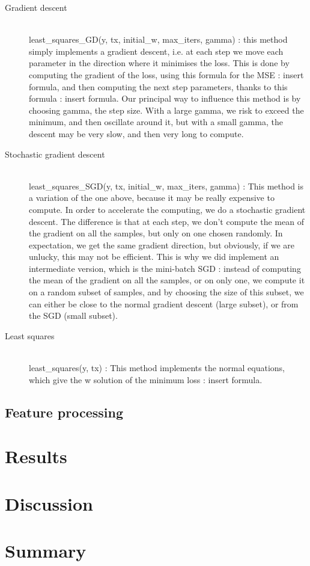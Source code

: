\documentclass[10pt,conference,compsocconf]{IEEEtran}
\begin{document}
\begin{description}

\item[Gradient descent] \ \\
least\_squares\_GD(y, tx, initial\_w, max\_iters, gamma) : this method simply implements a gradient descent, i.e. at each step we move each parameter in the direction where it minimises the loss. This is done by computing the gradient of the loss, using this formula for the MSE : {insert formula}, and then computing the next step parameters, thanks to this formula : {insert formula}. Our principal way to influence this method is by choosing gamma, the step size. With a large gamma, we risk to exceed the minimum, and then oscillate around it, but with a small gamma, the descent may be very slow, and then very long to compute.

\item[Stochastic gradient descent] \ \\
least\_squares\_SGD(y, tx, initial\_w, max\_iters, gamma) : This method is a variation of the one above, because it may be really expensive to compute. In order to accelerate the computing, we do a stochastic gradient descent. The difference is that at each step, we don’t compute the mean of the gradient on all the samples, but only on one chosen randomly. In expectation, we get the same gradient direction, but obviously, if we are unlucky, this may not be efficient. This is why we did implement an intermediate version, which is the mini-batch SGD : instead of computing the mean of the gradient on all the samples, or on only one, we compute it on a random subset of samples, and by choosing the size of this subset, we can either be close to the normal gradient descent (large subset), or from the SGD (small subset).

\item[Least squares] \ \\
least\_squares(y, tx) : This method implements the normal equations, which give the w solution of the minimum loss : {insert formula}.

\end{description}

\subsection{Feature processing}

\section{Results}



\section{Discussion}



\section{Summary}
\end{document}
